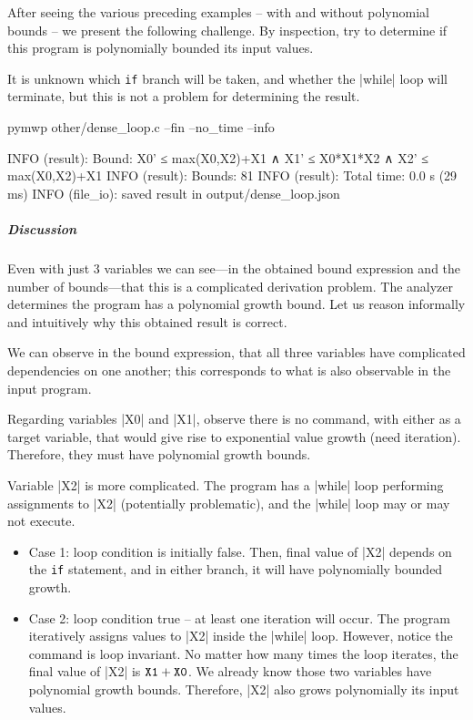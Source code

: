 After seeing the various preceding examples -- with and without polynomial bounds -- we present the following challenge.
By inspection, try to determine if this program is polynomially bounded \wrt its input values.

It is unknown which \texttt{if} branch will be taken, and whether the \pr|while| loop will terminate, but this is not a problem for determining the result.

\begin{cmdlisting}[label={lst:ex5-run-cmd}]
pymwp other/dense_loop.c --fin --no_time --info
\end{cmdlisting}

\begin{outlisting}[label={lst:ex5-output}]
INFO (result): Bound: X0' ≤ max(X0,X2)+X1 ∧ X1' ≤ X0*X1*X2 ∧ X2' ≤ max(X0,X2)+X1
INFO (result): Bounds: 81
INFO (result): Total time: 0.0 s (29 ms)
INFO (file_io): saved result in output/dense_loop.json
\end{outlisting}

\subparagraph*{Discussion}
Even with just 3 variables we can see---in the obtained bound expression and the number of bounds---that this is a complicated derivation problem.
The analyzer determines the program has a polynomial growth bound.
Let us reason informally and intuitively why this obtained result is correct.

We can observe in the bound expression, that all three variables have complicated dependencies on one another;
this corresponds to what is also observable in the input program.

Regarding variables \pr|X0| and \pr|X1|, observe there is no command, with either as a target variable, that would give rise to exponential value growth (need iteration).
Therefore, they must have polynomial growth bounds.

Variable \pr|X2| is more complicated.
The program has a \pr|while| loop performing assignments to \pr|X2| (potentially problematic), and the \pr|while| loop may or may not execute.

\begin{itemize}

\item Case 1: loop condition is initially false.
Then, final value of \pr|X2| depends on the \texttt{if} statement, and in either branch, it will have polynomially bounded growth.

\item Case 2: loop condition true -- at least one iteration will occur.
The program iteratively assigns values to \pr|X2| inside the \pr|while| loop.
However, notice the command is loop invariant.
No matter how many times the loop iterates, the final value of \pr|X2| is \(\prm{X1} + \prm{X0}\).
We already know those two variables have polynomial growth bounds.
Therefore, \pr|X2| also grows polynomially \wrt its input values.

\end{itemize}

